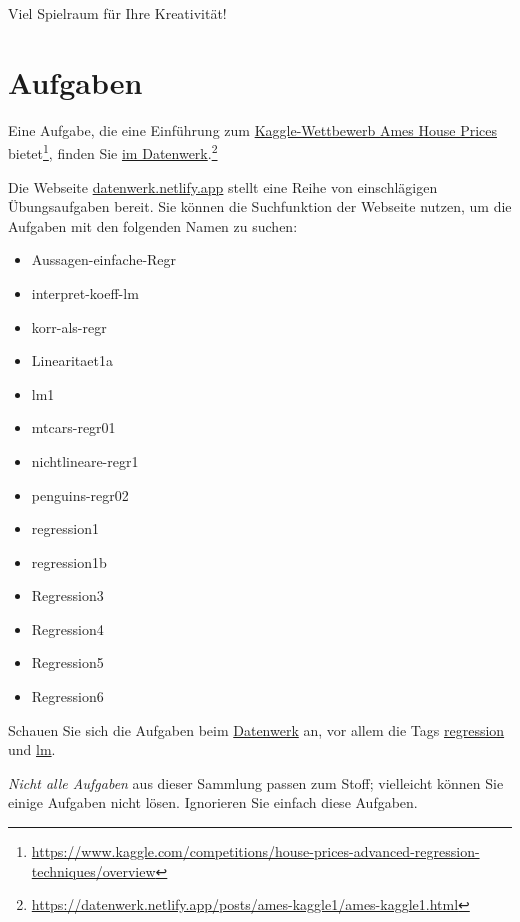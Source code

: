 \documentclass[
  letterpaper,
]{scrbook}
\providecommand{\tightlist}{%
  \setlength{\itemsep}{0pt}\setlength{\parskip}{0pt}}\usepackage{longtable,booktabs,array}
\theoremstyle{definition}
\theoremstyle{definition}
\theoremstyle{definition}
\theoremstyle{remark}
\begin{document}
Viel Spielraum für Ihre Kreativität!

\section{Aufgaben}\label{aufgaben-7}

Eine Aufgabe, die eine Einführung zum
\href{https://www.kaggle.com/competitions/house-prices-advanced-regression-techniques/overview}{Kaggle-Wettbewerb
Ames House Prices} bietet\footnote{\url{https://www.kaggle.com/competitions/house-prices-advanced-regression-techniques/overview}},
finden Sie
\href{https://datenwerk.netlify.app/posts/ames-kaggle1/ames-kaggle1.html}{im
Datenwerk}.\footnote{\url{https://datenwerk.netlify.app/posts/ames-kaggle1/ames-kaggle1.html}}

Die Webseite \href{https://datenwerk.netlify.app}{datenwerk.netlify.app}
stellt eine Reihe von einschlägigen Übungsaufgaben bereit. Sie können
die Suchfunktion der Webseite nutzen, um die Aufgaben mit den folgenden
Namen zu suchen:

\begin{itemize}
\tightlist
\item
  Aussagen-einfache-Regr
\item
  interpret-koeff-lm
\item
  korr-als-regr
\item
  Linearitaet1a
\item
  lm1
\item
  mtcars-regr01
\item
  nichtlineare-regr1
\item
  penguins-regr02
\item
  regression1
\item
  regression1b
\item
  Regression3
\item
  Regression4
\item
  Regression5
\item
  Regression6
\end{itemize}

Schauen Sie sich die Aufgaben beim
\href{https://datenwerk.netlify.app/}{Datenwerk} an, vor allem die Tags
\href{https://datenwerk.netlify.app/\#category=regression}{regression}
und \href{https://datenwerk.netlify.app/\#category=lm}{lm}.

\emph{Nicht alle Aufgaben} aus dieser Sammlung passen zum Stoff;
vielleicht können Sie einige Aufgaben nicht lösen. Ignorieren Sie
einfach diese Aufgaben.
\end{document}
